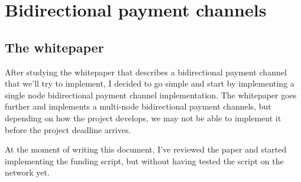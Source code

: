 \chapter*{Bidirectional payment channels}
\label{chap:bidir-pc}
\section{The whitepaper}
After studying the whitepaper\cite{decker2015fast} that describes a bidirectional payment channel that we'll try to implement, I decided to go simple and start by implementing a single node bidirectional payment channel implementation. The whitepaper goes further and implements a multi-node bidirectional payment channels, but depending on how the project develops, we may not be able to implement it before the project deadline arrives.

At the moment of writing this document, I've reviewed the paper and started implementing the funding script, but without having tested the script on the network yet.